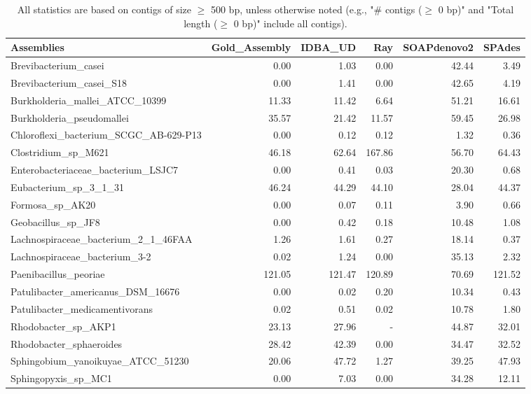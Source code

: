 \documentclass[12pt,a4paper]{article}
\begin{document}
\begin{table}[ht]
\begin{center}
\caption{All statistics are based on contigs of size $\geq$ 500 bp, unless otherwise noted (e.g., "\# contigs ($\geq$ 0 bp)" and "Total length ($\geq$ 0 bp)" include all contigs).}
\begin{tabular}{|l*{5}{|r}|}
\hline
Assemblies & Gold\_Assembly & IDBA\_UD & Ray & SOAPdenovo2 & SPAdes \\ \hline
Brevibacterium\_casei & 0.00 & 1.03 & 0.00 & 42.44 & 3.49 \\ \hline
Brevibacterium\_casei\_S18 & 0.00 & 1.41 & 0.00 & 42.65 & 4.19 \\ \hline
Burkholderia\_mallei\_ATCC\_10399 & 11.33 & 11.42 & 6.64 & 51.21 & 16.61 \\ \hline
Burkholderia\_pseudomallei & 35.57 & 21.42 & 11.57 & 59.45 & 26.98 \\ \hline
Chloroflexi\_bacterium\_SCGC\_AB-629-P13 & 0.00 & 0.12 & 0.12 & 1.32 & 0.36 \\ \hline
Clostridium\_sp\_M621 & 46.18 & 62.64 & 167.86 & 56.70 & 64.43 \\ \hline
Enterobacteriaceae\_bacterium\_LSJC7 & 0.00 & 0.41 & 0.03 & 20.30 & 0.68 \\ \hline
Eubacterium\_sp\_3\_1\_31 & 46.24 & 44.29 & 44.10 & 28.04 & 44.37 \\ \hline
Formosa\_sp\_AK20 & 0.00 & 0.07 & 0.11 & 3.90 & 0.66 \\ \hline
Geobacillus\_sp\_JF8 & 0.00 & 0.42 & 0.18 & 10.48 & 1.08 \\ \hline
Lachnospiraceae\_bacterium\_2\_1\_46FAA & 1.26 & 1.61 & 0.27 & 18.14 & 0.37 \\ \hline
Lachnospiraceae\_bacterium\_3-2 & 0.02 & 1.24 & 0.00 & 35.13 & 2.32 \\ \hline
Paenibacillus\_peoriae & 121.05 & 121.47 & 120.89 & 70.69 & 121.52 \\ \hline
Patulibacter\_americanus\_DSM\_16676 & 0.00 & 0.02 & 0.20 & 10.34 & 0.43 \\ \hline
Patulibacter\_medicamentivorans & 0.02 & 0.51 & 0.02 & 10.78 & 1.80 \\ \hline
Rhodobacter\_sp\_AKP1 & 23.13 & 27.96 & - & 44.87 & 32.01 \\ \hline
Rhodobacter\_sphaeroides & 28.42 & 42.39 & 0.00 & 34.47 & 32.52 \\ \hline
Sphingobium\_yanoikuyae\_ATCC\_51230 & 20.06 & 47.72 & 1.27 & 39.25 & 47.93 \\ \hline
Sphingopyxis\_sp\_MC1 & 0.00 & 7.03 & 0.00 & 34.28 & 12.11 \\ \hline

\end{tabular}
\end{center}
\end{table}
\end{document}
